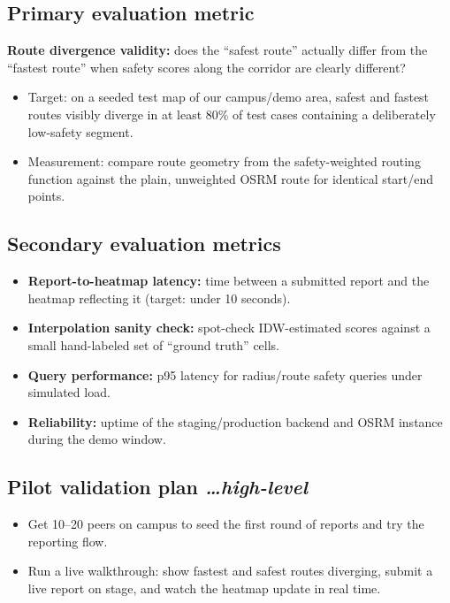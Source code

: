 \documentclass[11pt,a4paper]{article}
\newcommand{\BvrHint}[1]{%
  {\normalfont\normalsize\itshape\hfill #1}}
\begin{document}
\subsection{Primary evaluation metric}
\textbf{Route divergence validity:} does the ``safest route''
actually differ from the ``fastest route'' when safety scores
along the corridor are clearly different?
\begin{itemize}[leftmargin=0.7cm]
    \item Target: on a seeded test map of our campus/demo area,
    safest and fastest routes visibly diverge in at least 80\% of
    test cases containing a deliberately low-safety segment.
    \item Measurement: compare route geometry from the
    safety-weighted routing function against the plain,
    unweighted OSRM route for identical start/end points.
\end{itemize}

\subsection{Secondary evaluation metrics}
\begin{itemize}[leftmargin=0.7cm]
    \item \textbf{Report-to-heatmap latency:} time between a
    submitted report and the heatmap reflecting it (target: under
    10 seconds).
    \item \textbf{Interpolation sanity check:} spot-check
    IDW-estimated scores against a small hand-labeled set of
    ``ground truth'' cells.
    \item \textbf{Query performance:} p95 latency for
    radius/route safety queries under simulated load.
    \item \textbf{Reliability:} uptime of the staging/production
    backend and OSRM instance during the demo window.
\end{itemize}

\subsection{Pilot validation plan %
\BvrHint{\ldots high-level}}
\begin{itemize}[leftmargin=0.7cm]
    \item Get 10--20 peers on campus to seed the first round of
    reports and try the reporting flow.
    \item Run a live walkthrough: show fastest and safest routes
    diverging, submit a live report on stage, and watch the
    heatmap update in real time.
\end{itemize}
\end{document}
